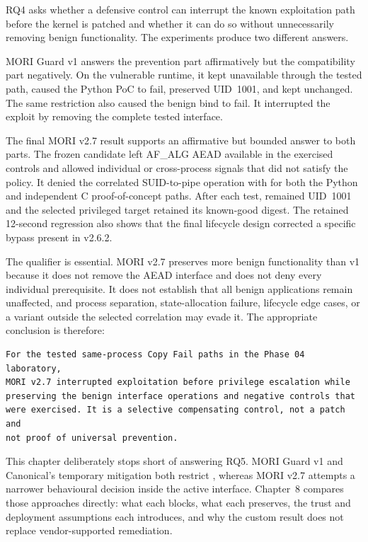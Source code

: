 RQ4 asks whether a defensive control can interrupt the known exploitation path
before the kernel is patched and whether it can do so without unnecessarily
removing benign functionality. The experiments produce two different answers.

MORI Guard v1 answers the prevention part affirmatively but the compatibility
part negatively. On the vulnerable  runtime, it kept
 unavailable through the tested  path, caused
the Python PoC to fail, preserved UID~1001, and kept 
unchanged. The same restriction also caused the benign  bind to
fail. It interrupted the exploit by removing the complete tested interface.

The final MORI v2.7 result supports an affirmative but bounded answer to both
parts. The frozen candidate left AF\_ALG AEAD available in the exercised
controls and allowed individual or cross-process signals that did not satisfy
the policy. It denied the correlated SUID-to-pipe operation with 
for both the Python and independent C proof-of-concept paths. After each test,
 remained UID~1001 and the selected privileged target retained
its known-good digest. The retained 12-second regression also shows that the
final lifecycle design corrected a specific bypass present in v2.6.2.

The qualifier is essential. MORI v2.7 preserves more benign functionality than
v1 because it does not remove the AEAD interface and does not deny every
individual prerequisite. It does not establish that all benign applications
remain unaffected, and process separation, state-allocation failure, lifecycle
edge cases, or a variant outside the selected correlation may evade it. The
appropriate conclusion is therefore:

\begin{lstlisting}
For the tested same-process Copy Fail paths in the Phase 04 laboratory,
MORI v2.7 interrupted exploitation before privilege escalation while
preserving the benign interface operations and negative controls that
were exercised. It is a selective compensating control, not a patch and
not proof of universal prevention.
\end{lstlisting}

This chapter deliberately stops short of answering RQ5. MORI Guard v1 and
Canonical's temporary mitigation both restrict , whereas
MORI v2.7 attempts a narrower behavioural decision inside the active interface.
Chapter~8 compares those approaches directly: what each blocks, what each
preserves, the trust and deployment assumptions each introduces, and why the
custom result does not replace vendor-supported remediation.